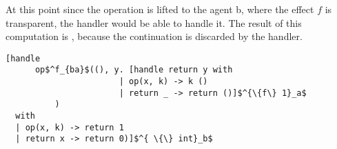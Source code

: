 At this point since the operation  is lifted to the agent b, where the effect $f$ is transparent, the handler would be able to handle it. The result of this computation is , because the continuation is discarded by the handler.
  \begin{lstlisting}[mathescape = true]
  [handle 
      op$^f_{ba}$((), y. [handle return y with
                       | op(x, k) -> k ()
                       | return _ -> return ()]$^{\{f\} 1}_a$ 
          )
  with 
  | op(x, k) -> return 1
  | return x -> return 0)]$^{ \{\} int}_b$   
\end{lstlisting}

